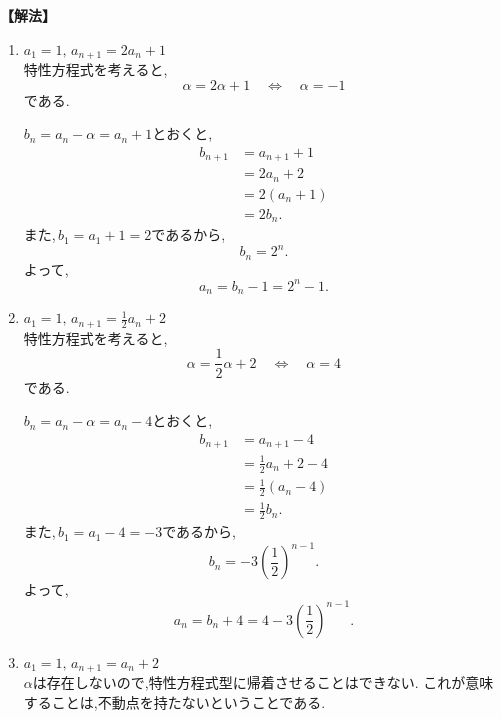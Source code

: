 \noindent\textbf{【解法】}
\begin{enumerate}[label=(\arabic*),parsep=3pt]
  \item $\displaystyle a_1=1,\,a_{n+1}=2a_n+1$\\
        特性方程式を考えると,
        \[
          \alpha=2\alpha+1
          \quad\Longleftrightarrow\quad
          \alpha=-1
        \]
        である.

        $b_n=a_n-\alpha=a_n+1$とおくと,
        \begin{align*}
          b_{n+1}
           & =a_{n+1}+1 \\
           & =2a_n+2    \\
           & =2(a_n+1)  \\
           & =2b_n.
        \end{align*}
        また,\,$b_1=a_1+1=2$であるから,
        \[
          b_n=2^n.
        \]
        よって,
        \[
          a_n=b_n-1=2^n-1.
        \]

  \item $\displaystyle a_1=1,\,a_{n+1}=\frac12a_n+2$\\
        特性方程式を考えると,
        \[
          \alpha=\frac12\alpha+2
          \quad\Longleftrightarrow\quad
          \alpha=4
        \]
        である.

        $b_n=a_n-\alpha=a_n-4$とおくと,
        \begin{align*}
          b_{n+1}
           & =a_{n+1}-4      \\
           & =\frac12a_n+2-4 \\
           & =\frac12(a_n-4) \\
           & =\frac12b_n.
        \end{align*}
        また,\,$b_1=a_1-4=-3$であるから,
        \[
          b_n=-3\left(\frac12\right)^{n-1}.
        \]
        よって,
        \[
          a_n=b_n+4
          =4-3\left(\frac12\right)^{n-1}.
        \]
  \item $\displaystyle a_1=1,\, a_{n+1}=a_n+2$\\
        $\alpha$は存在しないので,特性方程式型に帰着させることはできない.
        これが意味することは,不動点を持たないということである.
\end{enumerate}
